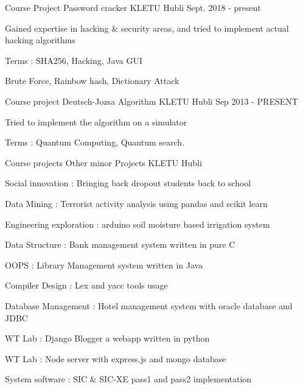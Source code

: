 \begin{cventries}

\cventry
{Course Project} %
{Password cracker} %
{KLETU Hubli} %
{Sept. 2018 - present} %
{ %
\begin{cvitems}
\item {Gained expertise in hacking \& security areas, and tried to implement actual hacking algorithms}
\item {Terms : SHA256, Hacking, Java GUI}
\item {Brute Force, Rainbow hash, Dictionary Attack}
\end{cvitems}
}


\cventry
{Course project} %
{Deutsch-Jozsa Algorithm} %
{KLETU Hubli} %
{Sep 2013 - PRESENT} %
{ %
\begin{cvitems}
\item {Tried to implement the algorithm on a simulator}
\item {Terms : Quantum Computing, Quantum search.}
\end{cvitems}
}

\cventry
{Course projects} %
{Other minor Projects} %
{KLETU Hubli} %
{} %
{ %
\begin{cvitems}
\item {Social innovation	: Bringing back dropout students back to school}
\item {Data Mining	: Terrorist activity analysis using  pandas and scikit learn}
\item {Engineering exploration	: arduino soil moisture based irrigation system}
\item {Data Structure	: Bank management system written in pure C}
\item {OOPS	: Library Management system written in Java}
\item {Compiler Design	: Lex and yacc tools usage}
\item {Database Management	: Hotel management system with oracle database and JDBC}
\item {WT Lab	: Django Blogger a webapp written in python}
\item {WT Lab	: Node server with express.js and mongo database}
\item {System software	: SIC \& SIC-XE pass1 and pass2 implementation}
\end{cvitems}
}


\end{cventries}
